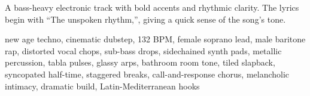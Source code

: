

\begin{notes}
A bass-heavy electronic track with bold accents and rhythmic clarity. %
The lyrics begin with “The unspoken rhythm,”, giving a quick sense of the song’s tone.
\end{notes}

\begin{style}
new age techno, cinematic dubstep, 132 BPM, female soprano lead, male baritone rap, distorted vocal chops, sub-bass drops, sidechained synth pads, metallic percussion, tabla pulses, glassy arps, bathroom room tone, tiled slapback, syncopated half-time, staggered breaks, call-and-response chorus, melancholic intimacy, dramatic build, Latin-Mediterranean hooks
\end{style}

